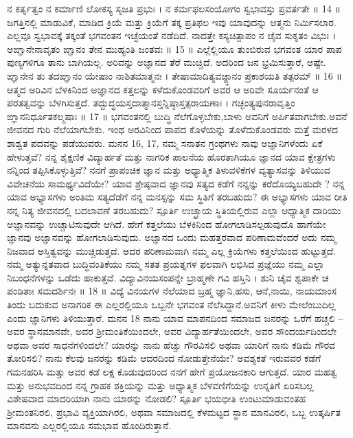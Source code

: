 ನ ಕರ್ತೃತ್ವಂ ನ ಕರ್ಮಾಣಿ ಲೋಕಸ್ಯ ಸೃಜತಿ ಪ್ರಭುಃ ।
ನ ಕರ್ಮಫಲಸಂಯೋಗಂ ಸ್ವಭಾವಸ್ತು ಪ್ರವರ್ತತೇ ॥ 14 ॥
 ಜಗತ್ತಿನಲ್ಲಿ ಮಾಡುವಿಕೆ, ಮಾಡಿದ ಕ್ರಿಯೆ ಮತ್ತು ಕ್ರಿಯೆಗೆ ತಕ್ಕ ಪ್ರತಿಫಲ ಇವು ಯಾವುದನ್ನು ಆತ್ಮನು ನಿರ್ಮಿಸಲಾರ. ಎಲ್ಲವೂ ಸ್ವಭಾವಕ್ಕೆ ತಕ್ಕಂತೆ ಭಗವಂತನ ಇಚ್ಛೆಯಂತೆ ನಡೆದಿದೆ.
ನಾದತ್ತೇ ಕಸ್ಯಚಿತ್ಪಾಪಂ ನ ಚೈವ ಸುಕೃತಂ ವಿಭುಃ ।
ಅಙ್ಞಾನೇನಾವೃತಂ ಙ್ಞಾನಂ ತೇನ ಮುಹ್ಯಂತಿ ಜಂತವಃ ॥ 15 ॥
 ಎಲ್ಲೆಲ್ಲಿಯೂ ತುಂಬಿರುವ ಭಗವಂತ ಯಾರ ಪಾಪ ಪುಣ್ಯಗಳಿಗೂ ತಾನು ಬಾಗಿಯಲ್ಲ. ಅರಿವನ್ನು ಅಜ್ಞಾನದ ತೆರೆ ಮುಚ್ಚಿದೆ. ಅದರಿಂದ ಜನ ಭ್ರಮಿಸುತ್ತಾರೆ, ಅಷ್ಟೇ.
ಙ್ಞಾನೇನ ತು ತದಙ್ಞಾನಂ ಯೇಷಾಂ ನಾಶಿತಮಾತ್ಮನಃ ।
ತೇಷಾಮಾದಿತ್ಯವಜ್ಙ್ಞಾನಂ ಪ್ರಕಾಶಯತಿ ತತ್ಪರಮ್ ॥ 16 ॥
 ಆತ್ಮದ ಅರಿವಿನ ಬೆಳಕಿನಿಂದ ಅಜ್ಞಾನದ ಕತ್ತಲನ್ನು ಕಳೆದುಕೊಂಡವರಿಗೆ ಅವರ ಆ ಅರಿವೇ ಸೂರ್ಯನಂತೆ ಆ ಪರತತ್ವವನ್ನು ಬೆಳಗಿಸುತ್ತದೆ.
ತದ್ಬುದ್ಧಯಸ್ತದಾತ್ಮಾನಸ್ತನ್ನಿಷ್ಠಾಸ್ತತ್ಪರಾಯಣಾಃ ।
ಗಚ್ಛಂತ್ಯಪುನರಾವೃತ್ತಿಂ ಙ್ಞಾನನಿರ್ಧೂತಕಲ್ಮಷಾಃ ॥ 17 ॥
 ಭಗವಂತನಲ್ಲಿ ಬುದ್ಧಿ ನೆಲೆಗೊಳ್ಳಬೇಕು,ಬಾಳು ಅವನಿಗೆ ಅರ್ಪಿತವಾಗಬೇಕು.ಅವನೆ ಜೀವನದ ಗುರಿ ನೆಲೆಯಾಗಬೇಕು. ಇಂಥ ಅರವಿನಿಂದ ಪಾಪದ ಕೊಳೆಯನ್ನು ತೊಳೆದುಕೊಂಡವರು ಮತ್ತೆ ಮರಳದ ಶಾಶ್ವತ ಪದವನ್ನು ಪಡೆಯುವರು.
ಮನನ 16, 17,
 ನಮ್ಮ ಸನಾತನ ಗ್ರಂಥಗಳು ನಾವು ಅಜ್ಞಾನಿಗಳೆಂದು ಏಕೆ ಹೇಳುತ್ತವೆ? ನನ್ನ ಶೈಕ್ಷಣಿಕ ವಿದ್ಯಾರ್ಹತೆ ಮತ್ತು ನಾಗರಿಕ ಪಾಲನೆಯ ಹೊರತಾಗಿಯೂ ಜ್ಞಾನದ ಯಾವ ಕ್ಷೇತ್ರಗಳು ನನ್ನಿಂದ ತಪ್ಪಿಸಿಕೊಳ್ಳುತ್ತಿವೆ? ನನಗೆ ಪ್ರಾಪಂಚಿಕ ಜ್ಞಾನ ಮತ್ತು ಅಧ್ಯಾತ್ಮಿಕ ತಿಳುವಳಿಕೆಗಳ ವ್ಯತ್ಯಾಸವನ್ನು ತಿಳಿಯುವ ವಿವೇಚನೆಯ ಸಾಮರ್ಥ್ಯವಿದೆಯೇ? ಯಾವ ಶ್ರೇಷ್ಠವಾದ  ಜ್ಞಾನವು  ಸತ್ಯದ ಕಡೆಗೆ ನನ್ನನ್ನು ಕರೆದೊಯ್ಯಬಹುದೇ ? ನನ್ನ ಯಾವ ಅಭ್ಯಾಸಗಳು ಅಂತಿಮ ಸತ್ಯದೆಡೆಗೆ ನನ್ನ ಮನಸ್ಸನ್ನು ಸಮ ಸ್ಥಿತಿಗೆ ತರಬಹುದು? ಈ ಅಭ್ಯಾಸಗಳು ಯಾವ ರೀತಿ ನನ್ನ ನಿತ್ಯ ಜೀವನದಲ್ಲಿ ಬದಲಾವಣೆ ತರಬಹುದು?
 ಸ್ಪೂರ್ತಿ 
 ಉಚ್ಛ್ರಾಯ   ಸ್ಥಿತಿಯಲ್ಲಿರುವ ಎಲ್ಲಾ ಆಧ್ಯಾತ್ಮಿಕ ದಾರಿಯು ಅಜ್ಞಾನವನ್ನು ಉಚ್ಚಾಟಿಸುವುದೇ   ಆಗಿದೆ. ಹೇಗೆ ಕತ್ತಲೆಯು ಬೆಳಕಿನಿಂದ ಹೋಗಲಾಡಿಸಲ್ಪಡುವುದೊ   ಹಾಗೆಯೇ ಜ್ಞಾನವು ಅಜ್ಞಾನವನ್ನು ಹೋಗಲಾಡಿಸುವುದು. ಅಜ್ಞಾನದ ಒಂದು ಮಹತ್ತರವಾದ ಪರಿಣಾಮವೆಂದರೆ ಅದು ನಮ್ಮ ನಿಜವಾದ ಅಸ್ತಿತ್ವವನ್ನು ಮುಚ್ಚಿಡುತ್ತದೆ. ಅದರ ಪರಿಣಾಮವಾಗಿ ನಮ್ಮ ಎಲ್ಲ ಕ್ರಿಯೆಗಳು ಕತ್ತಲೆಯಿಂದ ಹುಟ್ಟುತ್ತದೆ. ನಮ್ಮ ಅತ್ಯುನ್ನತವಾದ ಬುದ್ಧಿವಂತಿಕೆಯು ನಮ್ಮ ಸತತ ಪ್ರಯತ್ನಗಳ ಫಲವಾಗಿ ಲಭಿಸಿದ ಪ್ರಜ್ಞೆಯು ನಮ್ಮ ಎಲ್ಲಾ ನಿಬಂಧನೆಗಳನ್ನು ಒಡೆದು ಹಾಕುತ್ತವೆ.
ವಿದ್ಯಾವಿನಯಸಂಪನ್ನೇ ಬ್ರಾಹ್ಮಣೇ ಗವಿ ಹಸ್ತಿನಿ ।
ಶುನಿ ಚೈವ ಶ್ವಪಾಕೇ ಚ ಪಂಡಿತಾಃ ಸಮದರ್ಶಿನಃ ॥ 18 ॥
 ವಿದ್ಯೆ ವಿನಯಗಳ ನೆಲೆಯಾದ ಬ್ರಹ್ಮ ಜ್ಞಾನಿ,ಹಸು, ಆನೆ,ನಾಯಿ, ನಾಯಮಾಂಸ ತಿಂದು ಬದುಕುವ ಅನಾಗರಿಕ ಈ ಎಲ್ಲರಲ್ಲಿಯೂ ಒಬ್ಬನೇ ಭಗವಂತ ನೆಲೆಸಿದ್ದಾನೆ.ಅವನಿಗೆ ಕೀಳು ಮೇಲೆಂಬುದಿಲ್ಲ ಎಂದು ಜ್ಞಾನಿಗಳು ತಿಳಿಯುತ್ತಾರೆ.
ಮನನ 18
 ನಾನು ಯಾವ ಮಾಪನದಿಂದ ಸಮಾಜದ ಜನರನ್ನು ಒರೆಗೆ ಹಚ್ಚಲಿ – ಅವರ ಸ್ಥಾನಮಾನವೇ, ಅವರ ಶ್ರೀಮಂತಿಕೆಯಿಂದಲೇ, ಅವರ ವಿದ್ಯಾರ್ಹತೆಯಿಂದಲೇ, ಅವರ ಸೌಂದರ್ಯದಿಂದಲೇ ಅಥವಾ ಅವರ ಸಾಧನೆಗಳಿಂದಲೇ? ಯಾರನ್ನು ನಾನು ಹೆಚ್ಚು ಗೌರವಿಸಲಿ ಅಥವಾ ಯಾರಿಗೆ ನಾನು ಕಡಿಮೆ ಗೌರವ ತೋರಿಸಲಿ? ನಾನು ಕೆಲವು ಜನರನ್ನು ಕಡಿಮೆ ಆದರದಿಂದ ನೋಡುತ್ತೇನೆಯೇ? ಅವಶ್ಯಕತೆ ಇರುವವರ ಕಡೆಗೆ ಗಮನಹರಿಸಿ ಮತ್ತು ಅವರ ಕಡೆ ಲಕ್ಷ ಕೊಡುವುದರಿಂದ ನನಗೆ ಹೇಗೆ ಪ್ರಯೋಜನಕಾರಿ ಆಗುತ್ತದೆ. ಯಾರ ಮಹತ್ವ ಮತ್ತು ಅನುಭವದಿಂದ ನನ್ನ ಗ್ರಾಹಕ ಶಕ್ತಿಯನ್ನು ಮತ್ತು ಅಧ್ಯಾತ್ಮಿಕ ಬೆಳವಣಿಗೆಯನ್ನು ಉನ್ನತಿಗೆ ಏರಿಸಬಲ್ಲ ವಿಶೇಷವಾದ ಮಾದರಿಯಾಗಿ ನಾನು ಯಾರನ್ನು ನೋಡಲಿ?
 ಸ್ಪೂರ್ತಿ 
 ಭಯಭೀತಿ ಉಂಟುಮಾಡುವಂತಹ ಶ್ರೀಮಂತನಿರಲಿ, ಪ್ರಭಾವಿ ವ್ಯಕ್ತಿಯಾಗಿರಲಿ, ಅಥವಾ ಸಮಾಜದಲ್ಲಿ ಕೆಳಮಟ್ಟದ ಸ್ಥಾನ ಮಾನವಿರಲಿ, ಒಬ್ಬ ಉತ್ಕರ್ಷಿತ ಮಾನವನು ಎಲ್ಲರಲ್ಲಿಯೂ ಸಮಭಾವ ಹೊಂದಿರುತ್ತಾನೆ. 
